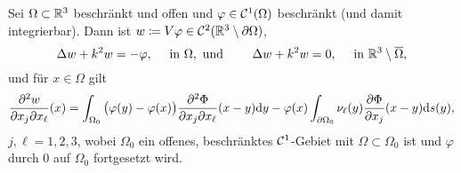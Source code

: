 \begin{lem}\label{lem: w ist lsg von helmholtz mit rhs -S}
	Sei \(\Omega\subset\mathbb{R}^3\) beschränkt und offen und \(\varphi\in\mathcal{C}^1(\Omega)\) beschränkt (und damit integrierbar). Dann ist \(w\coloneqq V\varphi\in\mathcal{C}^2(\mathbb{R}^3\setminus\partial\Omega)\),
	\begin{equation*}
		\Delta w+k^2w=-\varphi,\quad\text{ in }\Omega,\text{ und }\qquad\Delta w+k^2w=0,\quad\text{ in }\mathbb{R}^3\setminus\overline{\Omega},
	\end{equation*}
	und für \(x\in\Omega\) gilt
	\begin{equation}
		\label{w = VS zweimal part. abgeleitet}
		\frac{\partial^2w}{\partial x_j\partial x_\ell}(x)=\int_{\Omega_0}\big(\varphi(y)-\varphi(x)\big)\frac{\partial^2\Phi}{\partial x_j\partial x_\ell}(x-y)\mathrm{d}y-\varphi(x)\int_{\partial\Omega_0}\nu_\ell(y)\frac{\partial\Phi}{\partial x_j}(x-y)\mathrm{d}s(y),
	\end{equation}
	\(j,\ell=1,2,3\), wobei \(\Omega_0\) ein offenes, beschränktes \(\mathcal{C}^1\)-Gebiet mit \(\Omega\subset\Omega_0\) ist und \(\varphi\) durch \(0\) auf \(\Omega_0\) fortgesetzt wird.
\end{lem}
